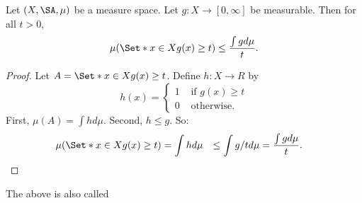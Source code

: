 \begin{prop}
Let $(X, \SA, \mu)$
be a measure space.
Let $g: X \to [0, \infty]$
be measurable.
Then for all $t > 0$,
\[
  \mu(\Set*{x \in X}{g(x) \geq t}) \leq \frac{\int g d\mu}{t}.
\]

\begin{proof}
  Let $A = \Set*{x \in X}{g(x) \geq t}$.
  Define $h: X \to R$ by
  \[
    h(x) = \begin{cases}
      1 & \text{ if } g(x) \geq t \\
      0 & \text{ otherwise. }
    \end{cases}
  \]
  First, $\mu(A) = \int h d\mu$.
  Second, $h \leq g$.
  So:
  \[
    \begin{aligned}
    \mu(\Set*{x \in X}{g(x) \geq t})
    &= \int h d\mu
    &\leq \int g/t d\mu
    &= \frac{\int g d\mu}{t}.
    \end{aligned}
  \]
\end{proof}
\end{prop}

The above is also called 
\strats
